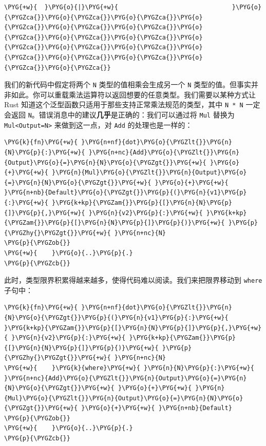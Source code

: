 \begin{Verbatim}[commandchars=\\\{\},breaklines=true,breakanywhere=true,fontsize=\codefont,xleftmargin=17bp]
\PYG{+w}{  }\PYG{o}{|}\PYG{+w}{                               }\PYG{o}{\PYGZca{}}\PYG{o}{\PYGZca{}}\PYG{o}{\PYGZca{}}\PYG{o}{\PYGZca{}}\PYG{o}{\PYGZca{}}\PYG{o}{\PYGZca{}}\PYG{o}{\PYGZca{}}\PYG{o}{\PYGZca{}}\PYG{o}{\PYGZca{}}\PYG{o}{\PYGZca{}}\PYG{o}{\PYGZca{}}\PYG{o}{\PYGZca{}}\PYG{o}{\PYGZca{}}\PYG{o}{\PYGZca{}}\PYG{o}{\PYGZca{}}\PYG{o}{\PYGZca{}}\PYG{o}{\PYGZca{}}
\end{Verbatim}

我们的新代码中假定将两个 \texttt{N} 类型的值相乘会生成另一个 \texttt{N} 类型的值。但事实并非如此。你可以重载乘法运算符以返回想要的任意类型。我们需要以某种方式让 Rust 知道这个泛型函数只适用于那些支持正常乘法规范的类型，其中 \texttt{N * N} 一定会返回 \texttt{N}。错误消息中的建议\textbf{几乎}是正确的：我们可以通过将 \texttt{Mul} 替换为 \texttt{Mul<Output=N>} 来做到这一点，对 \texttt{Add} 的处理也是一样的：

\begin{Verbatim}[commandchars=\\\{\},breaklines=true,breakanywhere=true,fontsize=\codefont,xleftmargin=17bp]
\PYG{k}{fn}\PYG{+w}{ }\PYG{n+nf}{dot}\PYG{o}{\PYGZlt{}}\PYG{n}{N}\PYG{p}{:}\PYG{+w}{ }\PYG{n+nc}{Add}\PYG{o}{\PYGZlt{}}\PYG{n}{Output}\PYG{o}{=}\PYG{n}{N}\PYG{o}{\PYGZgt{}}\PYG{+w}{ }\PYG{o}{+}\PYG{+w}{ }\PYG{n}{Mul}\PYG{o}{\PYGZlt{}}\PYG{n}{Output}\PYG{o}{=}\PYG{n}{N}\PYG{o}{\PYGZgt{}}\PYG{+w}{ }\PYG{o}{+}\PYG{+w}{ }\PYG{n+nb}{Default}\PYG{o}{\PYGZgt{}}\PYG{p}{(}\PYG{n}{v1}\PYG{p}{:}\PYG{+w}{ }\PYG{k+kp}{\PYGZam{}}\PYG{p}{[}\PYG{n}{N}\PYG{p}{]}\PYG{p}{,}\PYG{+w}{ }\PYG{n}{v2}\PYG{p}{:}\PYG{+w}{ }\PYG{k+kp}{\PYGZam{}}\PYG{p}{[}\PYG{n}{N}\PYG{p}{]}\PYG{p}{)}\PYG{+w}{ }\PYG{p}{\PYGZhy{}\PYGZgt{}}\PYG{+w}{ }\PYG{n+nc}{N}
\PYG{p}{\PYGZob{}}
\PYG{+w}{    }\PYG{o}{..}\PYG{p}{.}
\PYG{p}{\PYGZcb{}}
\end{Verbatim}

此时，类型限界积累得越来越多，使得代码难以阅读。我们来把限界移动到 \texttt{where} 子句中：

\begin{Verbatim}[commandchars=\\\{\},breaklines=true,breakanywhere=true,fontsize=\codefont,xleftmargin=17bp]
\PYG{k}{fn}\PYG{+w}{ }\PYG{n+nf}{dot}\PYG{o}{\PYGZlt{}}\PYG{n}{N}\PYG{o}{\PYGZgt{}}\PYG{p}{(}\PYG{n}{v1}\PYG{p}{:}\PYG{+w}{ }\PYG{k+kp}{\PYGZam{}}\PYG{p}{[}\PYG{n}{N}\PYG{p}{]}\PYG{p}{,}\PYG{+w}{ }\PYG{n}{v2}\PYG{p}{:}\PYG{+w}{ }\PYG{k+kp}{\PYGZam{}}\PYG{p}{[}\PYG{n}{N}\PYG{p}{]}\PYG{p}{)}\PYG{+w}{ }\PYG{p}{\PYGZhy{}\PYGZgt{}}\PYG{+w}{ }\PYG{n+nc}{N}
\PYG{+w}{    }\PYG{k}{where}\PYG{+w}{ }\PYG{n}{N}\PYG{p}{:}\PYG{+w}{ }\PYG{n+nc}{Add}\PYG{o}{\PYGZlt{}}\PYG{n}{Output}\PYG{o}{=}\PYG{n}{N}\PYG{o}{\PYGZgt{}}\PYG{+w}{ }\PYG{o}{+}\PYG{+w}{ }\PYG{n}{Mul}\PYG{o}{\PYGZlt{}}\PYG{n}{Output}\PYG{o}{=}\PYG{n}{N}\PYG{o}{\PYGZgt{}}\PYG{+w}{ }\PYG{o}{+}\PYG{+w}{ }\PYG{n+nb}{Default}
\PYG{p}{\PYGZob{}}
\PYG{+w}{    }\PYG{o}{..}\PYG{p}{.}
\PYG{p}{\PYGZcb{}}
\end{Verbatim}

